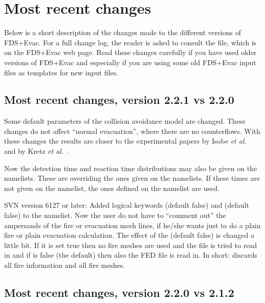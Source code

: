\documentclass[12pt,a4paper,final,twoside]{stylevk}
\begin{document}
\section{Most recent changes}\label{Sec_RecentChanges}

\noindent Below is a short description of the changes made to the
different versions of FDS+Evac.  For a full change log, the reader is
asked to consult the  file, which is on the FDS+Evac
web page.  Read these changes carefully if you have used older
versions of FDS+Evac and especially if you are using some old FDS+Evac
input files as templates for new input files.


\subsection{Most recent changes, version 2.2.1 vs
  2.2.0}\label{Sec_221vs221} 

\noindent Some default parameters of the collision avoidance model are
changed.  These changes do not affect ``normal evacuation'', where
there are no counterflows.  With these changes the results are closer
to the experimental papers by Isobe \emph{et al.}~\cite{Isobe2004} and
by Kretz \emph{et al.}~\cite{Kretz2006}.


Now the detection time and reaction time distributions may also be
given on the  namelists.  These are overriding the ones
given on the  namelists.  If these times are not given on
the  namelist, the ones defined on the 
namelist are used.


SVN version 6127 or later: Added logical keywords
 (default false) and 
(default false) to the  namelist.  Now the user do not
have to ``comment out'' the ampersands of the fire or evacuation mesh
lines, if he/she wants just to do a plain fire or plain evacuation
calculation.  The effect of the
\linebreak[4] (default false) is
changed a little bit.  If it is set true then no fire meshes are used
and the file is tried to read in and if  is
false (the default) then also the FED file is read in.  In short:
 discards all fire information and all
fire meshes.


\subsection{Most recent changes, version 2.2.0 vs
  2.1.2}\label{Sec_220vs212} 
\end{document}
